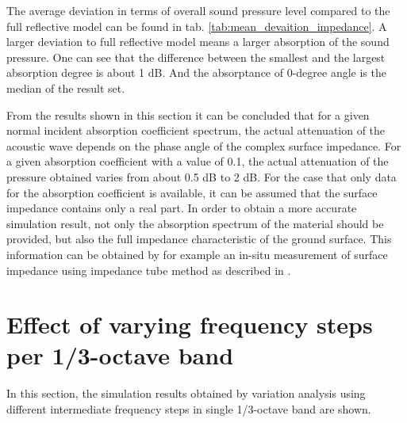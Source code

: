 The average deviation in terms of overall sound pressure level compared to the full reflective model can be found in tab. \ref{tab:mean_devaition_impedance}. A larger deviation to full reflective model means a larger absorption of the sound pressure. One can see that the difference between the smallest and the largest absorption degree is about 1 dB. And the absorptance of 0-degree angle is the median of the result set.

From the results shown in this section it can be concluded that for a given normal incident absorption coefficient spectrum, the actual attenuation of the acoustic wave depends on the phase angle of the complex surface impedance. For a given absorption coefficient with a value of 0.1, the actual attenuation of the pressure obtained varies from about 0.5 dB to 2 dB. For the case that only data for the absorption coefficient is available, it can be assumed that the surface impedance contains only a real part. In order to obtain a more accurate simulation result, not only the absorption spectrum of the material should be provided, but also the full impedance characteristic of the ground surface. This information can be obtained by for example an in-situ measurement of surface impedance using impedance tube method as described in \cite{hald_situ_2019, wolkesson_2013}.

\section{Effect of varying frequency steps per 1/3-octave band}

In this section, the simulation results obtained by variation analysis using different intermediate frequency steps in single 1/3-octave band are shown.

